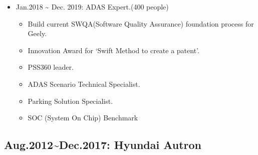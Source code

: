 \documentclass[12pt,a4paper]{article}
\begin{document}
\begin{itemize}
\item Jan.2018 {\textasciitilde} Dec. 2019: ADAS Expert.(400 people)

\begin{itemize}
\item Build current SWQA(Software Quality Assurance) foundation process for Geely.


\item Innovation Award for `Swift Method to create a patent'.


\item PSS360 leader.


\item ADAS Scenario Technical Specialist.


\item Parking Solution Specialist.


\item SOC (System On Chip) Benchmark

\end{itemize}
\end{itemize}
\subsection{Aug.2012{\textasciitilde}Dec.2017: Hyundai Autron}
\end{document}
